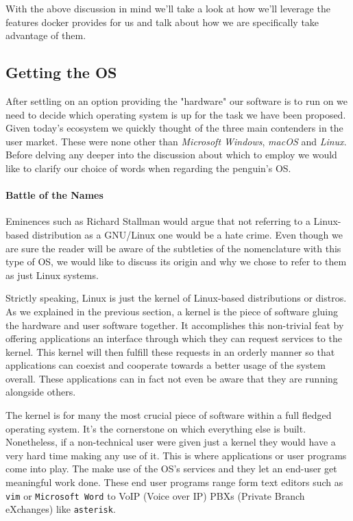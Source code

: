             With the above discussion in mind we'll take a look at how we'll leverage the features docker provides for us and talk about how we are specifically take advantage of them.

        \subsection{Getting the OS}
            After settling on an option providing the "hardware" our software is to run on we need to decide which operating system is up for the task we have been proposed. Given today's ecosystem we quickly thought of the three main contenders in the user market. These were none other than \textit{Microsoft Windows}, \textit{macOS} and \textit{Linux}. Before delving any deeper into the discussion about which to employ we would like to clarify our choice of words when regarding the penguin's OS.\\

            \paragraph{Battle of the Names}
                Eminences such as Richard Stallman would argue that not referring to a Linux-based distribution as a GNU/Linux one would be a hate crime. Even though we are sure the reader will be aware of the subtleties of the nomenclature with this type of OS, we would like to discuss its origin and why we chose to refer to them as just Linux systems.

                Strictly speaking, Linux is just the kernel of Linux-based distributions or distros. As we explained in the previous section, a kernel is the piece of software gluing the hardware and user software together. It accomplishes this non-trivial feat by offering applications an interface through which they can request services to the kernel. This kernel will then fulfill these requests in an orderly manner so that applications can coexist and cooperate towards a better usage of the system overall. These applications can in fact not even be aware that they are running alongside others.

                The kernel is for many the most crucial piece of software within a full fledged operating system. It's the cornerstone on which everything else is built. Nonetheless, if a non-technical user were given just a kernel they would have a very hard time making any use of it. This is where applications or user programs come into play. The make use of the OS's services and they let an end-user get meaningful work done. These end user programs range form text editors such as \texttt{vim} or \texttt{Microsoft Word} to VoIP (Voice over IP) PBXs (Private Branch eXchanges) like \texttt{asterisk}.

